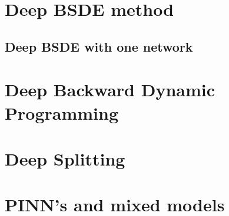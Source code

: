 \section{Deep BSDE method}
\subsection{Deep BSDE with one network}

\section{Deep Backward Dynamic Programming}
\section{Deep Splitting}
\section{PINN's and mixed models}